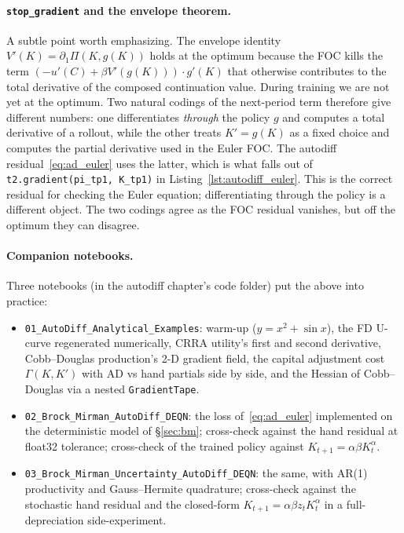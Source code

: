 \documentclass[11pt,a4paper]{report}
\begin{document}
\paragraph{\texttt{stop\_gradient} and the envelope theorem.}  A subtle point worth emphasizing.  The envelope identity $V'(K) = \partial_1 \Pi(K, g(K))$ holds at the optimum because the FOC kills the term $(-u'(C) + \beta V'(g(K)))\cdot g'(K)$ that otherwise contributes to the total derivative of the composed continuation value.  During training we are not yet at the optimum.  Two natural codings of the next-period term therefore give different numbers: one differentiates \emph{through} the policy $g$ and computes a total derivative of a rollout, while the other treats $K'=g(K)$ as a fixed choice and computes the partial derivative used in the Euler FOC.  The autodiff residual~\eqref{eq:ad_euler} uses the latter, which is what falls out of \texttt{t2.gradient(pi\_tp1, K\_tp1)} in Listing~\ref{lst:autodiff_euler}.  This is the correct residual for checking the Euler equation; differentiating through the policy is a different object.  The two codings agree as the FOC residual vanishes, but off the optimum they can disagree.

\paragraph{Companion notebooks.}  Three notebooks (in the autodiff chapter's code folder) put the above into practice:
\begin{itemize}[itemsep=2pt]
\item \texttt{01\_AutoDiff\_Analytical\_Examples}: warm-up ($y=x^2 + \sin x$), the FD U-curve regenerated numerically, CRRA utility's first and second derivative, Cobb--Douglas production's 2-D gradient field, the capital adjustment cost $\Gamma(K,K')$ with AD vs hand partials side by side, and the Hessian of Cobb--Douglas via a nested \texttt{GradientTape}.
\item \texttt{02\_Brock\_Mirman\_AutoDiff\_DEQN}: the loss of~\eqref{eq:ad_euler} implemented on the deterministic model of \S\ref{sec:bm}; cross-check against the hand residual at float32 tolerance; cross-check of the trained policy against $K_{t+1} = \alpha\beta K_t^\alpha$.
\item \texttt{03\_Brock\_Mirman\_Uncertainty\_AutoDiff\_DEQN}: the same, with AR(1) productivity and Gauss--Hermite quadrature; cross-check against the stochastic hand residual and the closed-form $K_{t+1} = \alpha\beta z_t K_t^\alpha$ in a full-depreciation side-experiment.
\end{itemize}
\end{document}
